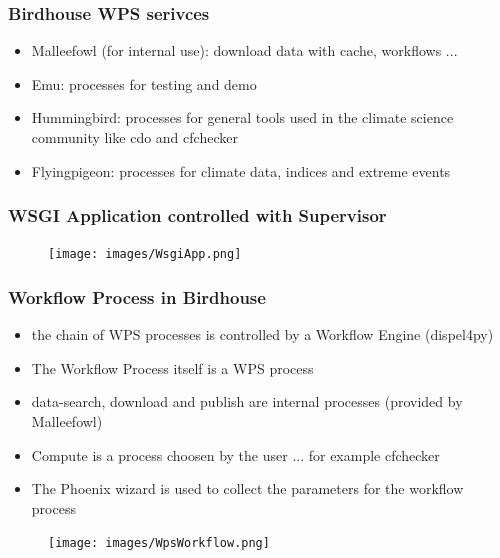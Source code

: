 \documentclass{beamer}
\begin{document}

  \begin{frame}
    \frametitle{Birdhouse WPS serivces}
    \begin{itemize}
      \item Malleefowl (for internal use): download data with cache, workflows ...
      \item Emu: processes for testing and demo
      \item Hummingbird: processes for general tools used in the climate science community like cdo and cfchecker
      \item Flyingpigeon: processes for climate data, indices and extreme events
    \end{itemize}
  \end{frame}



  \begin{frame}
    \frametitle{WSGI Application controlled with Supervisor}
    \begin{figure}
      \texttt{[image: images/WsgiApp.png]}
    \end{figure}
  \end{frame}


  \begin{frame}
    \frametitle{Workflow Process in Birdhouse}
    \begin{itemize}
      \item the chain of WPS processes is controlled by a Workflow Engine (dispel4py) 
      \item The Workflow Process itself is a WPS process
      \item data-search, download and publish are internal processes (provided by Malleefowl)
      \item Compute is a process choosen by the user ... for example cfchecker
      \item The Phoenix wizard is used to collect the parameters for the workflow process
    \end{itemize}
    \begin{figure}
      \texttt{[image: images/WpsWorkflow.png]}
    \end{figure}
  \end{frame}

\end{document}
